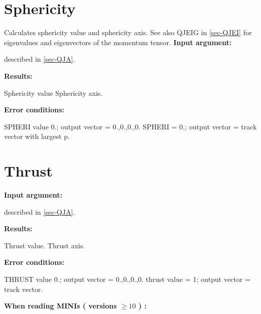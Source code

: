 \section{\label{sec-QJSP}Sphericity}
\par
{}
\par
\par
Calculates sphericity value and sphericity axis.
See also QJEIG in \ref{sec-QJEI} for eigenvalues and eigenvectors
of the momentum tensor.
{\bf Input argument:}
\begin{indentlist}{ 3.00cm}{ 3.25cm}
described in \ref{sec-QJA}.
\end{indentlist}
 
{\bf Results:}
\begin{indentlist}{ 3.00cm}{ 3.25cm}
Sphericity value
Sphericity axis.
\end{indentlist}
 
{\bf Error conditions:}
\begin{indentlist}{ 3.00cm}{ 3.25cm}
SPHERI value 0.; output vector = 0.,0.,0.,0.
SPHERI = 0.; output vector = track vector with
largest p.
\end{indentlist}
\section{\label{sec-QJTH}Thrust}
\par
{}
\par
\par
{\bf Input argument:}
\begin{indentlist}{ 3.00cm}{ 3.25cm}
described in \ref{sec-QJA}.
\end{indentlist}
 
{\bf Results:}
\begin{indentlist}{ 3.00cm}{ 3.25cm}
Thrust value.
Thrust axis.
\end{indentlist}
 
{\bf Error conditions:}
\begin{indentlist}{ 3.00cm}{ 3.25cm}
THRUST value 0.; output vector = 0.,0.,0.,0.
thrust value = 1; output vector = track vector.
\end{indentlist}
{\bf When reading MINIs ( versions $\geq 10$ ) :}
 

